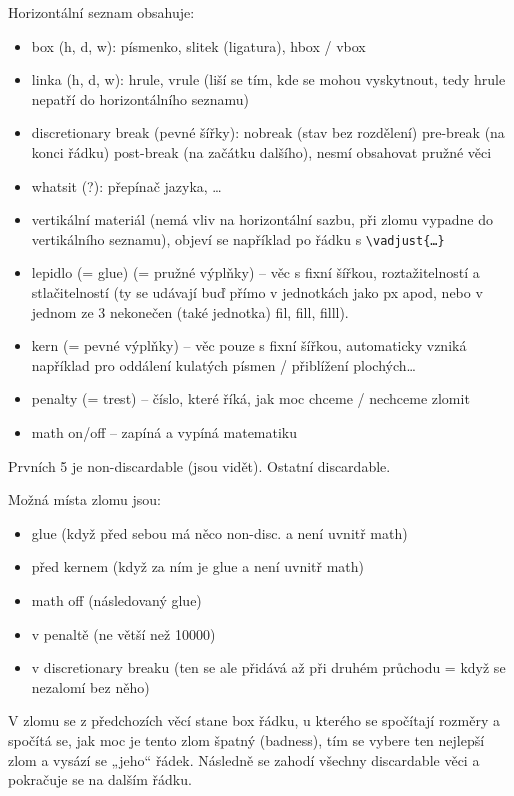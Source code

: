 \documentclass[12pt]{article}					%
\begin{document}
        Horizontální seznam obsahuje:
        \begin{itemize}
            \item box (h, d, w): písmenko, slitek (ligatura), hbox / vbox
            \item linka (h, d, w): hrule, vrule (liší se tím, kde se mohou vyskytnout, tedy hrule nepatří do horizontálního seznamu)
            \item discretionary break (pevné šířky): nobreak (stav bez rozdělení) pre-break (na konci řádku) post-break (na začátku dalšího), nesmí obsahovat pružné věci

            \item whatsit (?): přepínač jazyka, …
            \item vertikální materiál (nemá vliv na horizontální sazbu, při zlomu vypadne do vertikálního seznamu), objeví se například po řádku s \verb'\vadjust{…}'
            \item lepidlo (= glue) (= pružné výplňky) -- věc s fixní šířkou, roztažitelností a stlačitelností (ty se udávají buď přímo v jednotkách jako px apod, nebo v jednom ze 3 nekonečen (také jednotka) fil, fill, filll).
            \item kern (= pevné výplňky) -- věc pouze s fixní šířkou, automaticky vzniká například pro oddálení kulatých písmen / přiblížení plochých…
            \item penalty (= trest) -- číslo, které říká, jak moc chceme / nechceme zlomit
            \item math on/off -- zapíná a vypíná matematiku

        \end{itemize}
        Prvních 5 je non-discardable (jsou vidět). Ostatní discardable.

        Možná místa zlomu jsou:
        \begin{itemize}
            \item glue (když před sebou má něco non-disc. a není uvnitř math)
            \item před kernem (když za ním je glue a není uvnitř math)
            \item math off (následovaný glue)
            \item v penaltě (ne větší než 10000)
            \item v discretionary breaku (ten se ale přidává až při druhém průchodu = když se nezalomí bez něho)
        \end{itemize}

        V zlomu se z předchozích věcí stane box řádku, u kterého se spočítají rozměry a spočítá se, jak moc je tento zlom špatný (badness), tím se vybere ten nejlepší zlom a vysází se „jeho“ řádek. Následně se zahodí všechny discardable věci a pokračuje se na dalším řádku.
\end{document}
